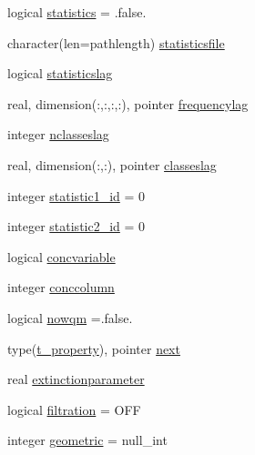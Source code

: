 \begin{DoxyCompactItemize}
\item 
logical \mbox{\hyperlink{structmodulelagrangian_1_1t__property_af43a1a5563c34523f6ed096e69f686ba}{statistics}} = .false.
\item 
character(len=pathlength) \mbox{\hyperlink{structmodulelagrangian_1_1t__property_ac3b34766cfff948cf9de68b8435cebf8}{statisticsfile}}
\item 
logical \mbox{\hyperlink{structmodulelagrangian_1_1t__property_a29f0ee85cbc15dfc3100bc85ef7ae505}{statisticslag}}
\item 
real, dimension(\+:,\+:,\+:,\+:), pointer \mbox{\hyperlink{structmodulelagrangian_1_1t__property_add9db0a7cca5b0a36a629d67f7c0b8c9}{frequencylag}}
\item 
integer \mbox{\hyperlink{structmodulelagrangian_1_1t__property_ad694ffefab62007e00db95fdf7cef5ab}{nclasseslag}}
\item 
real, dimension(\+:,\+:), pointer \mbox{\hyperlink{structmodulelagrangian_1_1t__property_acd5e8de7a2ebf26a2f0a5c43fdd92d93}{classeslag}}
\item 
integer \mbox{\hyperlink{structmodulelagrangian_1_1t__property_aaf9454bf32c80ac7d6226b3423f368af}{statistic1\+\_\+id}} = 0
\item 
integer \mbox{\hyperlink{structmodulelagrangian_1_1t__property_a4c5ad54659d34ee6584edda8aa8afb32}{statistic2\+\_\+id}} = 0
\item 
logical \mbox{\hyperlink{structmodulelagrangian_1_1t__property_ab35e582332fccacde74bc52cbd09952f}{concvariable}}
\item 
integer \mbox{\hyperlink{structmodulelagrangian_1_1t__property_a75b8f62a8f9a5dfa5802a0bc860cd546}{conccolumn}}
\item 
logical \mbox{\hyperlink{structmodulelagrangian_1_1t__property_a3c79262fa8fcbee8623a289a795d607e}{nowqm}} =.false.
\item 
type(\mbox{\hyperlink{structmodulelagrangian_1_1t__property}{t\+\_\+property}}), pointer \mbox{\hyperlink{structmodulelagrangian_1_1t__property_ad92f6543eee75a96d8a19244f96315ee}{next}}
\item 
real \mbox{\hyperlink{structmodulelagrangian_1_1t__property_a3c6add3a6cdf52a53202f6a1a9dbde47}{extinctionparameter}}
\item 
logical \mbox{\hyperlink{structmodulelagrangian_1_1t__property_adcce8ce74ec477fcd88868b892ec72e3}{filtration}} = O\+FF
\item 
integer \mbox{\hyperlink{structmodulelagrangian_1_1t__property_a3e65af2097e0e476e1d1dcd184e5f565}{geometric}} = null\+\_\+int
\end{DoxyCompactItemize}


